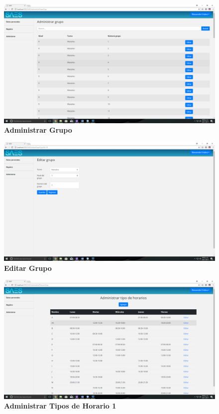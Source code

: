 \begin{figure}[H]
  \centering
    \includegraphics[scale=0.2]{project/images/45.png}
  \caption{\textbf{Administrar Grupo}}
\end{figure}
\begin{figure}[H]
  \centering
    \includegraphics[scale=0.2]{project/images/46.png}
  \caption{\textbf{Editar Grupo}}
\end{figure}
\begin{figure}[H]
  \centering
    \includegraphics[scale=0.2]{project/images/47.png}
  \caption{\textbf{Administrar Tipos de Horario 1}}
\end{figure}
